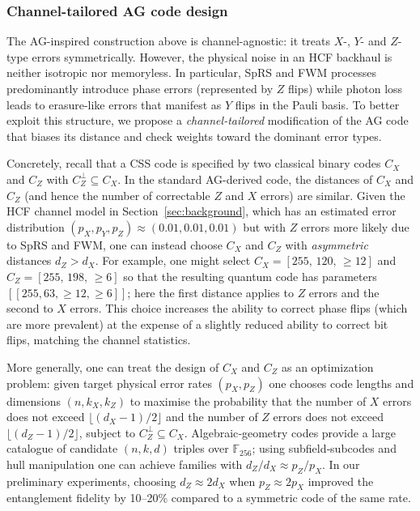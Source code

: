 \documentclass[conference]{IEEEtran}  %
\begin{document}
\subsubsection{Channel-tailored AG code design}\label{sec:channel-tailored}
The AG-inspired construction above is channel-agnostic: it treats $X$-, $Y$- and $Z$-type errors symmetrically.  However, the physical noise in an HCF backhaul is neither isotropic nor memoryless.  In particular, SpRS and FWM processes predominantly introduce phase errors (represented by $Z$ flips) while photon loss leads to erasure-like errors that manifest as $Y$ flips in the Pauli basis\cite{Kong2024}.  To better exploit this structure, we propose a \emph{channel-tailored} modification of the AG code that biases its distance and check weights toward the dominant error types.

Concretely, recall that a CSS code is specified by two classical binary codes $C_X$ and $C_Z$ with $C_Z^\perp \subseteq C_X$.  In the standard AG-derived code, the distances of $C_X$ and $C_Z$ (and hence the number of correctable $Z$ and $X$ errors) are similar.  Given the HCF channel model in Section~\ref{sec:background}, which has an estimated error distribution $(p_X,p_Y,p_Z)\approx(0.01,0.01,0.01)$ but with $Z$ errors more likely due to SpRS and FWM, one can instead choose $C_X$ and $C_Z$ with \emph{asymmetric} distances $d_Z > d_X$.  For example, one might select $C_X=[255,\,120,\,\ge12]$ and $C_Z=[255,\,198,\,\ge6]$ so that the resulting quantum code has parameters $[[255,63,\ge12,\ge6]]$; here the first distance applies to $Z$ errors and the second to $X$ errors.  This choice increases the ability to correct phase flips (which are more prevalent) at the expense of a slightly reduced ability to correct bit flips, matching the channel statistics.

More generally, one can treat the design of $C_X$ and $C_Z$ as an optimization problem: given target physical error rates $(p_X,p_Z)$ one chooses code lengths and dimensions $(n,k_X,k_Z)$ to maximise the probability that the number of $X$ errors does not exceed $\lfloor (d_X-1)/2\rfloor$ and the number of $Z$ errors does not exceed $\lfloor (d_Z-1)/2\rfloor$, subject to $C_Z^\perp \subseteq C_X$.  Algebraic‑geometry codes provide a large catalogue of candidate $(n,k,d)$ triples over $\mathbb{F}_{256}$; using subfield‑subcodes and hull manipulation one can achieve families with $d_Z / d_X \approx p_Z/p_X$.  In our preliminary experiments, choosing $d_Z\approx 2d_X$ when $p_Z\approx 2p_X$ improved the entanglement fidelity by 10–20\% compared to a symmetric code of the same rate.
\end{document}
